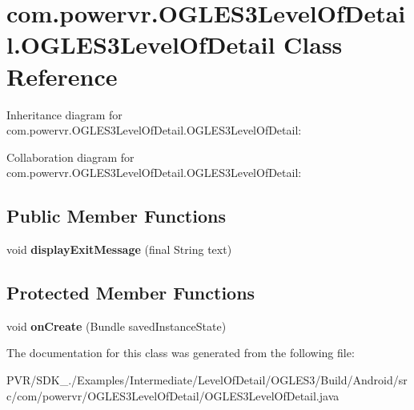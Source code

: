\hypertarget{classcom_1_1powervr_1_1_o_g_l_e_s3_level_of_detail_1_1_o_g_l_e_s3_level_of_detail}{\section{com.\+powervr.\+O\+G\+L\+E\+S3\+Level\+Of\+Detail.\+O\+G\+L\+E\+S3\+Level\+Of\+Detail Class Reference}
\label{classcom_1_1powervr_1_1_o_g_l_e_s3_level_of_detail_1_1_o_g_l_e_s3_level_of_detail}
}


Inheritance diagram for com.\+powervr.\+O\+G\+L\+E\+S3\+Level\+Of\+Detail.\+O\+G\+L\+E\+S3\+Level\+Of\+Detail\+:


Collaboration diagram for com.\+powervr.\+O\+G\+L\+E\+S3\+Level\+Of\+Detail.\+O\+G\+L\+E\+S3\+Level\+Of\+Detail\+:
\subsection*{Public Member Functions}
\begin{DoxyCompactItemize}
\item 
\hypertarget{classcom_1_1powervr_1_1_o_g_l_e_s3_level_of_detail_1_1_o_g_l_e_s3_level_of_detail_af79a1ac0fc3bd22c0aa40da7eabe2518}{void {\bfseries display\+Exit\+Message} (final String text)}\label{classcom_1_1powervr_1_1_o_g_l_e_s3_level_of_detail_1_1_o_g_l_e_s3_level_of_detail_af79a1ac0fc3bd22c0aa40da7eabe2518}

\end{DoxyCompactItemize}
\subsection*{Protected Member Functions}
\begin{DoxyCompactItemize}
\item 
\hypertarget{classcom_1_1powervr_1_1_o_g_l_e_s3_level_of_detail_1_1_o_g_l_e_s3_level_of_detail_ad55c6c579f90378a8aef7d3aef1bc707}{void {\bfseries on\+Create} (Bundle saved\+Instance\+State)}\label{classcom_1_1powervr_1_1_o_g_l_e_s3_level_of_detail_1_1_o_g_l_e_s3_level_of_detail_ad55c6c579f90378a8aef7d3aef1bc707}

\end{DoxyCompactItemize}


The documentation for this class was generated from the following file\+:\begin{DoxyCompactItemize}
\item 
P\+V\+R/\+S\+D\+K\+\_./\+Examples/\+Intermediate/\+Level\+Of\+Detail/\+O\+G\+L\+E\+S3/\+Build/\+Android/src/com/powervr/\+O\+G\+L\+E\+S3\+Level\+Of\+Detail/O\+G\+L\+E\+S3\+Level\+Of\+Detail.\+java\end{DoxyCompactItemize}
